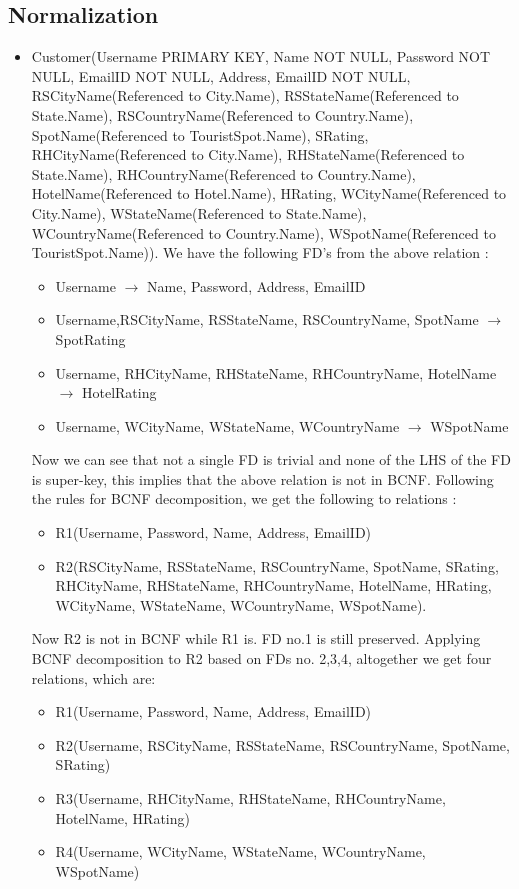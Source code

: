 \documentclass[11pt]{article}
\begin{document}
\subsection{Normalization}
\begin{itemize}
\item Customer(Username PRIMARY KEY, Name NOT NULL, Password NOT NULL, EmailID NOT NULL, Address, EmailID NOT NULL, RSCityName(Referenced to City.Name), RSStateName(Referenced to State.Name), RSCountryName(Referenced to Country.Name), SpotName(Referenced to TouristSpot.Name), SRating, RHCityName(Referenced to City.Name), RHStateName(Referenced to State.Name), RHCountryName(Referenced to Country.Name), HotelName(Referenced to Hotel.Name), HRating, WCityName(Referenced to City.Name), WStateName(Referenced to State.Name), WCountryName(Referenced to Country.Name), WSpotName(Referenced to TouristSpot.Name)). \newline \newline
We have the following FD’s from the above relation :
\begin{itemize}
\item Username $\rightarrow$ Name, Password, Address, EmailID
\item Username,RSCityName, RSStateName, RSCountryName, SpotName $\rightarrow$ SpotRating
\item Username, RHCityName, RHStateName, RHCountryName, HotelName $\rightarrow$ HotelRating
\item Username, WCityName, WStateName, WCountryName $\rightarrow$ WSpotName
\end{itemize}
Now we can see that not a single FD is trivial and none of the LHS of the FD is super-key, this implies that the above relation is not in BCNF. Following the rules for BCNF decomposition, we get the following to relations :
\begin{itemize}
\item R1(Username, Password, Name, Address, EmailID)
\item R2(RSCityName, RSStateName, RSCountryName, SpotName, SRating, RHCityName, RHStateName, RHCountryName, HotelName, HRating, WCityName, WStateName, WCountryName, WSpotName).
\end{itemize}
Now R2 is not in BCNF while R1 is. FD no.1 is still preserved. Applying BCNF decomposition to R2 based on FDs no. 2,3,4, altogether we get four relations, which are:
\begin{itemize}
\item R1(Username, Password, Name, Address, EmailID)
\item R2(Username, RSCityName, RSStateName, RSCountryName, SpotName, SRating)
\item R3(Username, RHCityName, RHStateName, RHCountryName, HotelName, HRating)
\item R4(Username, WCityName, WStateName, WCountryName, WSpotName)
\end{itemize}


\end{itemize}
\end{document}
